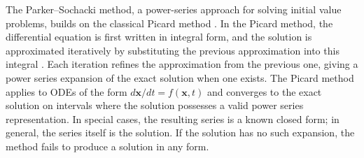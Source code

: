 \documentclass{article}
\begin{document}






The Parker--Sochacki method, a power-series approach for solving initial value problems, builds on the classical Picard method \cite{Parker1996}. In the Picard method, the differential equation is first written in integral form, and the solution is approximated iteratively by substituting the previous approximation into this integral \cite{Boyce2017}. Each iteration refines the approximation from the previous one, giving a power series expansion of the exact solution when one exists. The Picard method applies to ODEs of the form $d\mathbf{x}/dt=f(\mathbf{x},t)$ and converges to the exact solution on intervals where the solution possesses a valid power series representation. In special cases, the resulting series is a known closed form; in general, the series itself is the solution. If the solution has no such expansion, the method fails to produce a solution in any form.
\end{document}

